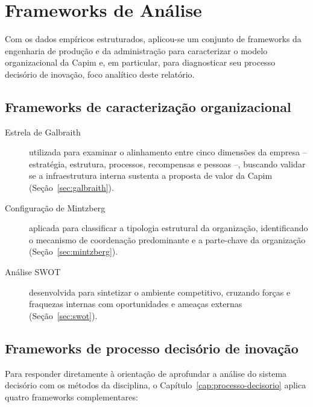 \section{Frameworks de Análise}

Com os dados empíricos estruturados, aplicou-se um conjunto de frameworks da engenharia de produção e da administração para caracterizar o modelo organizacional da Capim e, em particular, para diagnosticar seu processo decisório de inovação, foco analítico deste relatório.

\subsection{Frameworks de caracterização organizacional}

\begin{description}
  \item[Estrela de Galbraith] utilizada para examinar o alinhamento entre cinco dimensões da empresa -- estratégia, estrutura, processos, recompensas e pessoas --, buscando validar se a infraestrutura interna sustenta a proposta de valor da Capim (Seção~\ref{sec:galbraith}).
  \item[Configuração de Mintzberg] aplicada para classificar a tipologia estrutural da organização, identificando o mecanismo de coordenação predominante e a parte-chave da organização (Seção~\ref{sec:mintzberg}).
  \item[Análise SWOT] desenvolvida para sintetizar o ambiente competitivo, cruzando forças e fraquezas internas com oportunidades e ameaças externas (Seção~\ref{sec:swot}).
\end{description}

\subsection{Frameworks de processo decisório de inovação}

Para responder diretamente à orientação de aprofundar a análise do sistema decisório com os métodos da disciplina, o Capítulo~\ref{cap:processo-decisorio} aplica quatro frameworks complementares:

